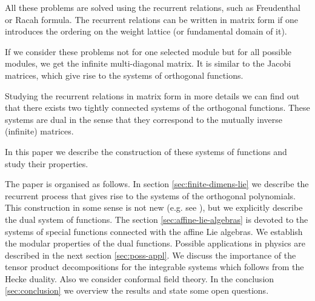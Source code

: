 \documentclass[a4paper,12pt]{article}
\theoremstyle{definition} \newtheorem{Def}{Definition}
\begin{document}
All these problems are solved using the recurrent relations, such as Freudenthal or Racah formula. 
The recurrent relations can be written in matrix form if one introduces the ordering on the weight lattice (or fundamental domain of it).

If we consider these problems not for one selected module but for all possible modules, we get the infinite multi-diagonal matrix. It is similar to the Jacobi matrices, which give rise to the systems of orthogonal functions.

Studying the recurrent relations in matrix form in more details we can find out that there exists two tightly connected systems of the orthogonal functions. These systems are dual in the sense that they correspond to the mutually inverse (infinite) matrices. 

In this paper we describe the construction of these systems of functions and study their properties. 

The paper is organised as follows. In section \ref{sec:finite-dimens-lie} we describe the recurrent process that gives rise to the systems of the orthogonal polynomials. This construction in some sense is not new (e.g. see \cite{2010arXiv1001.3683N}), but we explicitly describe the dual system of functions.  The section \ref{sec:affine-lie-algebras} is devoted to the systems of special functions connected with the affine Lie algebras. We establish the modular properties of the dual functions. Possible applications in physics are described in the next section \ref{sec:poss-appl}. We discuss the importance of the tensor product decompositions for the integrable systems which follows from the Hecke duality. Also we consider conformal field theory.
In the conclusion \ref{sec:conclusion} we overview the results and state some open questions.
\end{document}
